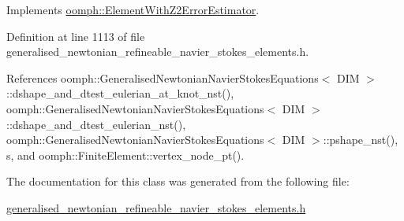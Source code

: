 Implements \hyperlink{classoomph_1_1ElementWithZ2ErrorEstimator_a0eedccc33519f852c5dc2055ddf2774b}{oomph\+::\+Element\+With\+Z2\+Error\+Estimator}.



Definition at line 1113 of file generalised\+\_\+newtonian\+\_\+refineable\+\_\+navier\+\_\+stokes\+\_\+elements.\+h.



References oomph\+::\+Generalised\+Newtonian\+Navier\+Stokes\+Equations$<$ D\+I\+M $>$\+::dshape\+\_\+and\+\_\+dtest\+\_\+eulerian\+\_\+at\+\_\+knot\+\_\+nst(), oomph\+::\+Generalised\+Newtonian\+Navier\+Stokes\+Equations$<$ D\+I\+M $>$\+::dshape\+\_\+and\+\_\+dtest\+\_\+eulerian\+\_\+nst(), oomph\+::\+Generalised\+Newtonian\+Navier\+Stokes\+Equations$<$ D\+I\+M $>$\+::pshape\+\_\+nst(), s, and oomph\+::\+Finite\+Element\+::vertex\+\_\+node\+\_\+pt().



The documentation for this class was generated from the following file\+:\begin{DoxyCompactItemize}
\item 
\hyperlink{generalised__newtonian__refineable__navier__stokes__elements_8h}{generalised\+\_\+newtonian\+\_\+refineable\+\_\+navier\+\_\+stokes\+\_\+elements.\+h}\end{DoxyCompactItemize}
